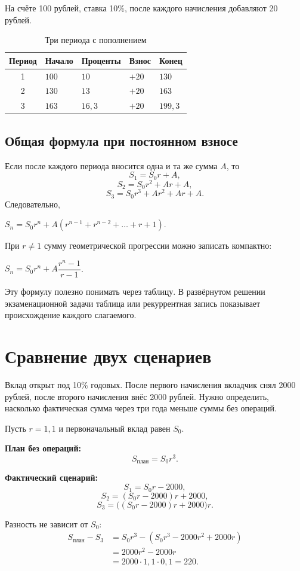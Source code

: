 \documentclass[a4paper,12pt]{article}
\newcommand{\term}[1]{\textcolor{darkaccent}{\textbf{#1}}}
\newcommand{\formula}[1]{%
  \begin{center}
    \begin{minipage}{0.92\linewidth}
      \centering\large\color{darkaccent}#1
    \end{minipage}
  \end{center}}
\begin{document}
На счёте 100 рублей, ставка 10\%, после каждого начисления добавляют 20 рублей.

\begin{table}[ht]
\centering
\caption{Три периода с пополнением}
\begin{tabularx}{\linewidth}{@{}cXXXX@{}}
\toprule
Период & Начало & Проценты & Взнос & Конец \\
\midrule
1 & $100$ & $10$ & $+20$ & $130$ \\
2 & $130$ & $13$ & $+20$ & $163$ \\
3 & $163$ & $16{,}3$ & $+20$ & $199{,}3$ \\
\bottomrule
\end{tabularx}
\end{table}

\subsection{Общая формула при постоянном взносе}

Если после каждого периода вносится одна и та же сумма $A$, то
\[
S_1=S_0r+A,
\]
\[
S_2=S_0r^2+Ar+A,
\]
\[
S_3=S_0r^3+Ar^2+Ar+A.
\]
Следовательно,
\formula{$S_n=S_0r^n+A\left(r^{n-1}+r^{n-2}+\dots+r+1\right)$.}

При $r\ne1$ сумму геометрической прогрессии можно записать компактно:
\formula{$S_n=S_0r^n+A\dfrac{r^n-1}{r-1}$.}

Эту формулу полезно понимать через таблицу. В развёрнутом решении экзаменационной задачи таблица или рекуррентная запись показывает происхождение каждого слагаемого.

\section{Сравнение двух сценариев}

Вклад открыт под 10\% годовых. После первого начисления вкладчик снял 2000 рублей, после второго начисления внёс 2000 рублей. Нужно определить, насколько фактическая сумма через три года меньше суммы без операций.

Пусть $r=1{,}1$ и первоначальный вклад равен $S_0$.

\term{План без операций:}
\[
S_{\text{план}}=S_0r^3.
\]

\term{Фактический сценарий:}
\[
S_1=S_0r-2000,
\]
\[
S_2=(S_0r-2000)r+2000,
\]
\[
S_3=\bigl((S_0r-2000)r+2000\bigr)r.
\]

Разность не зависит от $S_0$:
\begin{align*}
S_{\text{план}}-S_3
&=S_0r^3-\left(S_0r^3-2000r^2+2000r\right)\\
&=2000r^2-2000r\\
&=2000\cdot1{,}1\cdot0{,}1=220.
\end{align*}
\end{document}
